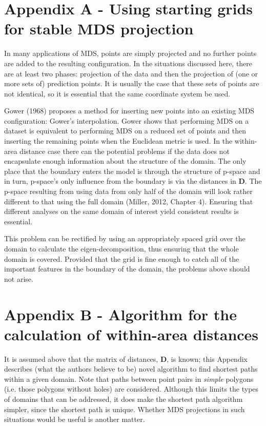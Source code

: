 \documentclass[useAMS, referee]{biom}
\begin{document}
\section*{Appendix A - Using starting grids for stable MDS projection}

In many applications of MDS, points are simply projected and no further points are added to the resulting configuration. In the situations discussed here, there are at least two phases: projection of the data and then the projection of (one or more sets of) prediction points. It is usually the case that these sets of points are not identical, so it is essential that the same coordinate system be used.

Gower (1968) proposes a method for inserting new points into an existing MDS configuration: Gower's interpolation. Gower shows that performing MDS on a dataset is equivalent to performing MDS on a reduced set of points and then inserting the remaining points when the Euclidean metric is used. In the within-area distance case there can the potential problems if the data does not encapsulate enough information about the structure of the domain. The only place that the boundary enters the model is through the structure of p-space and in turn, p-space's only influence from the boundary is via the distances in $\mathbf{D}$. The p-space resulting from using data from only half of the domain will look rather different to that using the full domain (Miller, 2012, Chapter 4). Ensuring that different analyses on the same domain of interest yield consistent results is essential.

This problem can be rectified by using an appropriately spaced grid over the domain to calculate the eigen-decomposition, thus ensuring that the whole domain is covered. Provided that the grid is fine enough to catch all of the important features in the boundary of the domain, the problems above should not arise.

\section*{Appendix B - Algorithm for the calculation of within-area distances}

It is assumed above that the matrix of distances, $\mathbf{D}$, is known; this Appendix describes (what the authors believe to be) novel algorithm to find shortest paths within a given domain. Note that paths between point pairs in \textit{simple} polygons (i.e. those polygons without holes) are considered. Although this limits the types of domains that can be addressed, it does make the shortest path algorithm simpler, since the shortest path is unique. Whether MDS projections in such situations would be useful is another matter.
\end{document}
